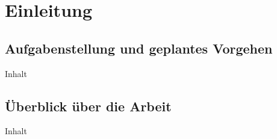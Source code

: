 \chapter{Einleitung\label{chap1:Erstes-Kapitel}}

\section{Aufgabenstellung und geplantes Vorgehen\label{sec1.1:Unterpunkt-1}}

Inhalt

\section{Überblick über die Arbeit\label{sec1.2:Unterpunkt-2}}

Inhalt